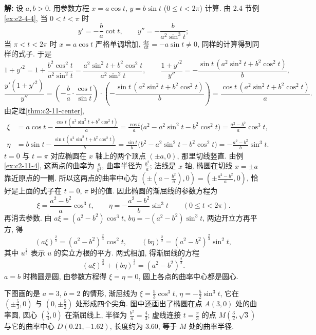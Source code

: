 \documentclass[UTF8,openany]{ctexbook}
\theoremstyle{chinesetextbook}
\newenvironment{cnsolution}{\par\indent\textbf{解:} \ignorespaces}{\par}
\newcommand{\dd}{\mathrm d}
\begin{document}
\begin{cnsolution}
设 $a,b>0$. 用参数方程 $x=a\cos t$, $y=b\sin t$ ($0\le t<2\pi$) 计算. 由 2.4 节例\ref{ex:c2-4-4}, 当 $0<t<\pi$ 时
\[
y'=-\frac ba\cot t,\qquad y''=-\frac b{a^2\sin^3t};
\]
当 $\pi<t<2\pi$ 时 $x=a\cos t$ 严格单调增加, $\displaystyle\frac{\dd x}{\dd t}=-a\sin t\ne0$, 同样的计算得到同样的式子. 于是
\[
1+y'^2=1+\frac{b^2\cos^2t}{a^2\sin^2t}=\frac{a^2\sin^2t+b^2\cos^2t}{a^2\sin^2t},\qquad\frac{1+y'^2}{y''}=-\frac{\sin t\,(a^2\sin^2t+b^2\cos^2t)}b,
\]
\[
\frac{y'(1+y'^2)}{y''}=\left(-\frac ba\cdot\frac{\cos t}{\sin t}\right)\cdot\left(-\frac{\sin t\,(a^2\sin^2t+b^2\cos^2t)}b\right)=\frac{\cos t\,(a^2\sin^2t+b^2\cos^2t)}a.
\]
由定理\ref{thm:c2-11-center},
\[
\begin{aligned}
\xi&=a\cos t-\frac{\cos t\,(a^2\sin^2t+b^2\cos^2t)}a=\frac{\cos t}a\bigl(a^2-a^2\sin^2t-b^2\cos^2t\bigr)=\frac{a^2-b^2}a\cos^3t,\\
\eta&=b\sin t-\frac{\sin t\,(a^2\sin^2t+b^2\cos^2t)}b=\frac{\sin t}b\bigl(b^2-a^2\sin^2t-b^2\cos^2t\bigr)=-\frac{a^2-b^2}b\sin^3t.
\end{aligned}
\]
$t=0$ 与 $t=\pi$ 对应椭圆在 $x$ 轴上的两个顶点 $(\pm a,0)$, 那里切线竖直. 由例\ref{ex:c2-11-4}, 这两点的曲率为 $\displaystyle\frac a{b^2}$, 曲率半径为 $\displaystyle\frac{b^2}a$; 法线是 $x$ 轴, 椭圆在切线 $x=\pm a$ 靠近原点的一侧. 所以这两点的曲率中心为 $\displaystyle\left(\pm\left(a-\frac{b^2}a\right),0\right)=\left(\pm\frac{a^2-b^2}a,0\right)$, 恰好是上面的式子在 $t=0$, $\pi$ 时的值. 因此椭圆的渐屈线的参数方程为
\[
\xi=\frac{a^2-b^2}a\cos^3t,\qquad\eta=-\frac{a^2-b^2}b\sin^3t\qquad(0\le t<2\pi).
\]
再消去参数. 由 $a\xi=(a^2-b^2)\cos^3t$, $b\eta=-(a^2-b^2)\sin^3t$, 两边开立方再平方, 得
\[
(a\xi)^{\frac23}=(a^2-b^2)^{\frac23}\cos^2t,\qquad(b\eta)^{\frac23}=(a^2-b^2)^{\frac23}\sin^2t,
\]
其中 $u^{\frac23}$ 表示 $u$ 的实立方根的平方. 两式相加, 得渐屈线的方程
\[
(a\xi)^{\frac23}+(b\eta)^{\frac23}=(a^2-b^2)^{\frac23}.
\]
$a=b$ 时椭圆是圆, 由参数方程得 $\xi=\eta=0$, 圆上各点的曲率中心都是圆心.
\end{cnsolution}
下图画的是 $a=3$, $b=2$ 的情形, 渐屈线为 $\displaystyle\xi=\frac53\cos^3t$, $\displaystyle\eta=-\frac52\sin^3t$, 它在 $\displaystyle\left(\pm\frac53,0\right)$ 与 $\displaystyle\left(0,\pm\frac52\right)$ 处形成四个尖角. 图中还画出了椭圆在点 $A(3,0)$ 处的曲率圆, 圆心 $\displaystyle\left(\frac53,0\right)$ 在渐屈线上, 半径为 $\displaystyle\frac{b^2}a=\frac43$; 虚线连接 $\displaystyle t=\frac\pi3$ 的点 $\displaystyle M\left(\frac32,\sqrt3\right)$ 与它的曲率中心 $D(0.21,-1.62)$, 长度约为 $3.60$, 等于 $M$ 处的曲率半径.
\end{document}
